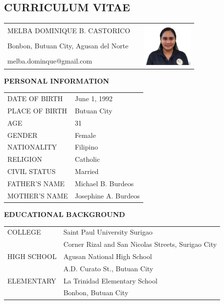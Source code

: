 \documentclass[12pt]{report}
\newcommand{\authora}{
    Melba Dominique B. Castorico %
}
\begin{document}
\begin{spacing}{1.55}

\chapter*{CURRICULUM VITAE}

\begin{tabularx}{\linewidth}{@{}lXr}
    \MakeUppercase{\authora} && \multirow{3}{*}{\includegraphics[width=1in]{img/burdeos}} \\ %
    Bonbon, Butuan City, Agusan del Norte && \\
    melba.dominque@gmail.com && \\
\end{tabularx}

\vspace{20pt}

\textbf{PERSONAL INFORMATION}

\vspace{-10pt}
\hrulefill

\begin{tabular}{@{}l@{ : }l}
    DATE OF BIRTH & June 1, 1992 \\
    PLACE OF BIRTH & Butuan City \\
    AGE & 31 \\
    GENDER & Female \\
    NATIONALITY & Filipino \\
    RELIGION & Catholic \\
    CIVIL STATUS & Married \\
    FATHER'S NAME & Michael B. Burdeos \\
    MOTHER'S NAME & Josephine A. Burdeos \\
\end{tabular}

\vspace{20pt}

\textbf{EDUCATIONAL BACKGROUND}

\vspace{-10pt}
\hrulefill

\begin{tabular}{@{}l@{ : }l}
    COLLEGE & Saint Paul University Surigao \\
    & Corner Rizal and San Nicolas Streets, Surigao City \\
    HIGH SCHOOL & Agusan National High School\\
    & A.D. Curato St., Butuan City \\
    ELEMENTARY & La Trinidad Elementary School \\
    & Bonbon, Butuan City \\
\end{tabular}

\end{spacing}
\end{document}
